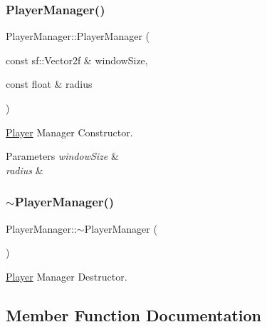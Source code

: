 \subsubsection{\texorpdfstring{Player\+Manager()}{PlayerManager()}}
{\footnotesize\ttfamily Player\+Manager\+::\+Player\+Manager (\begin{DoxyParamCaption}\item[{const sf\+::\+Vector2f \&}]{window\+Size,  }\item[{const float \&}]{radius }\end{DoxyParamCaption})}



\hyperlink{class_player}{Player} Manager Constructor. 


\begin{DoxyParams}{Parameters}
{\em window\+Size} & \\
\hline
{\em radius} & \\
\hline
\end{DoxyParams}
\mbox{\label{class_player_manager_ab53de6b16914b7591fc2bd3038069ac7}} 
\subsubsection{\texorpdfstring{$\sim$\+Player\+Manager()}{~PlayerManager()}}
{\footnotesize\ttfamily Player\+Manager\+::$\sim$\+Player\+Manager (\begin{DoxyParamCaption}{ }\end{DoxyParamCaption})\hspace{0.3cm}{\ttfamily [virtual]}}



\hyperlink{class_player}{Player} Manager Destructor. 



\subsection{Member Function Documentation}
\mbox{\label{class_player_manager_ac4bad97c7d281a47a876d7cee5f864bd}} 

